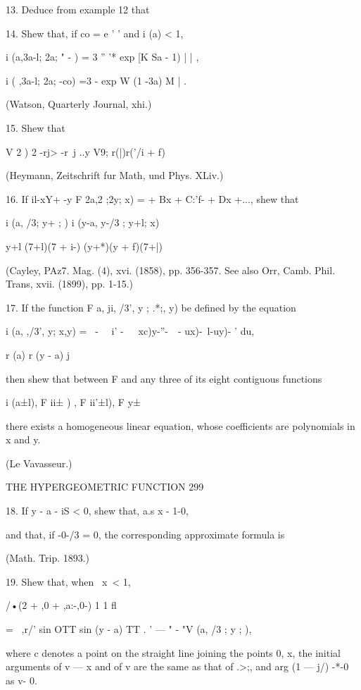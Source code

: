 13. Deduce from example 12 that

14. Shew that, if co = e ' ' and i (a) < 1,

i (a,3a-l; 2a; " - ) = 3 '' '* exp [K Sa - 1) | | ,

i ( ,3a-l; 2a; -co) =3 - exp W (1 -3a) M | .

(Watson, Quarterly Journal, xhi.)

15. Shew that

V 2 ) 2 -rj> -r\ j ..y V9; r(|)r('/i + f)

(Heymann, Zeitschrift fur Math, und Phys. XLiv.)

16. If il-xY+ -y F 2a,2 ;2y; x) = + Bx + C:'f- + Dx +..., shew that

i (a, /3; y+ ; ) i (y-a, y-/3 ; y+l; x)

y+l (7+l)(7 + i-) (y+*)(y + f)(7+|)

(Cayley, PAz7. Mag. (4), xvi. (1858), pp. 356-357. See also Orr, Camb.
Phil. Trans, xvii. (1899), pp. 1-15.)

17. If the function F a, ji, /3', y ; .*;, y) be defined by the
equation

i (a, ,/3', y; x,y) = \ - \ \ i' -\ \ ~xc)y-''-\ \ - ux)-\ l-uy)- '
du,

r (a) r (y - a) j

then shew that between F and any three of its eight contiguous
functions

i (a±l), F ii± ) , F ii'±l), F y±\ \

there exists a homogeneous linear equation, whose coefficients are
polynomials in x and y.

(Le Vavasseur.)



THE HYPERGEOMETRIC FUNCTION 299

18. If y - a - iS < 0, shew that, a.s x - 1-0,

and that, if -0-/3 = 0, the corresponding approximate formula is

(Math. Trip. 1893.)

19. Shew that, when \ x\ < 1,



/•(2 + ,0 + ,a:-,0-) 1 1 fl



= \ ,r/' sin OTT sin (y - a) TT . ' — " - "V (a, /3 ; y ; ),

where c denotes a point on the straight line joining the points 0, x,
the initial arguments of v — x and of v are the same as that of .>;,
and arg (1 — j/) -*-0 as v- 0.

